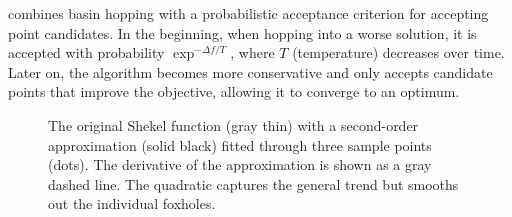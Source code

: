 \vspace{1em}

 combines basin hopping with a probabilistic acceptance criterion for accepting point candidates. 
In the beginning, when hopping into a worse solution, it is accepted with probability $\exp^{-\Delta f / T}$, where $T$ (temperature) decreases over time. 
Later on, the algorithm becomes more conservative and only accepts candidate points that improve the objective, allowing it to converge to an optimum.





\vspace{1em}
\vspace{1.5em}

\begin{figure}[h]
    \centering
    \caption{The original Shekel function (gray thin) with a second-order approximation (solid black) fitted through three sample points (dots). The derivative of the approximation is shown as a gray dashed line. The quadratic captures the general trend but smooths out the individual foxholes.}
    \label{fig:shekel_foxholes_approximation}
\end{figure}

